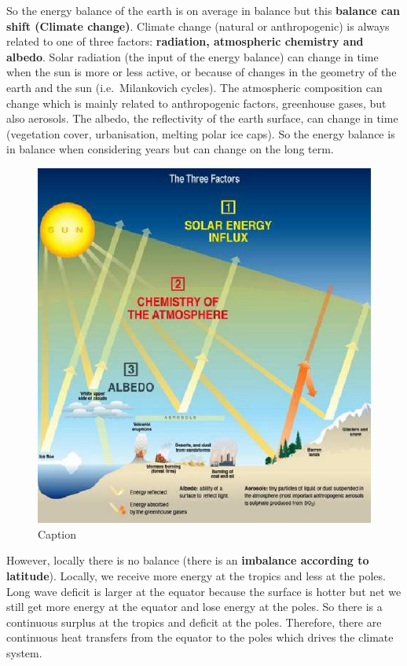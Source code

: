 \documentclass[12pt,oneside]{book}
\begin{document}
So the energy balance of the earth is on average in balance but this
\textbf{balance can shift (Climate change)}. Climate change (natural or
anthropogenic) is always related to one of three factors:
\textbf{radiation, atmospheric chemistry and albedo}. Solar radiation
(the input of the energy balance) can change in time when the sun is
more or less active, or because of changes in the geometry of the earth
and the sun (i.e.~Milankovich cycles). The atmospheric composition can
change which is mainly related to anthropogenic factors, greenhouse
gases, but also aerosols. The albedo, the reflectivity of the earth
surface, can change in time (vegetation cover, urbanisation, melting
polar ice caps). So the energy balance is in balance when considering
years but can change on the long term.

\begin{figure}

{\centering \includegraphics[width=0.6\linewidth]{figures/Figure142} 

}

\caption{Caption}\label{fig:EnergyBudget4}
\end{figure}

However, locally there is no balance (there is an \textbf{imbalance
according to latitude}). Locally, we receive more energy at the tropics
and less at the poles. Long wave deficit is larger at the equator
because the surface is hotter but net we still get more energy at the
equator and lose energy at the poles. So there is a continuous surplus
at the tropics and deficit at the poles. Therefore, there are continuous
heat transfers from the equator to the poles which drives the climate
system.
\end{document}
